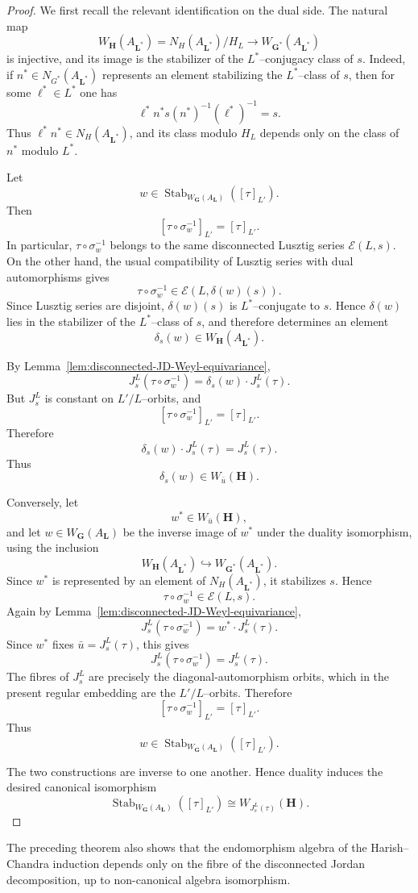 \documentclass{amsart}
\theoremstyle{plain}
\numberwithin{equation}{section}
\theoremstyle{definition}
\newcommand{\Stab}{\operatorname{Stab}}
\newcommand{\bG}{\mathbf{G}}
\newcommand{\bL}{\mathbf{L}}
\newcommand{\bH}{\mathbf{H}}
\begin{document}
\begin{proof}
We first recall the relevant identification on the dual side.  The natural
map
\[
W_{\bH}(A_{\bL^*})
=
N_H(A_{\bL^*})/H_L
\longrightarrow
W_{\bG^*}(A_{\bL^*})
\]
is injective, and its image is the stabilizer of the $L^*$--conjugacy class
of $s$.  Indeed, if $n^*\in N_{G^*}(A_{\bL^*})$ represents an element
stabilizing the $L^*$--class of $s$, then for some $\ell^*\in L^*$ one has
\[
\ell^* n^* s(n^*)^{-1}(\ell^*)^{-1}=s.
\]
Thus $\ell^*n^*\in N_H(A_{\bL^*})$, and its class modulo $H_L$ depends only
on the class of $n^*$ modulo $L^*$.

Let
\[
w\in \Stab_{W_{\bG}(A_{\bL})}([\tau]_{L'}).
\]
Then
\[
[\tau\circ\sigma_w^{-1}]_{L'}=[\tau]_{L'}.
\]
In particular, $\tau\circ\sigma_w^{-1}$ belongs to the same disconnected
Lusztig series $\mathcal E(L,s)$.  On the other hand, the usual compatibility
of Lusztig series with dual automorphisms gives
\[
\tau\circ\sigma_w^{-1}
\in
\mathcal E(L,\delta(w)(s)).
\]
Since Lusztig series are disjoint, $\delta(w)(s)$ is $L^*$--conjugate to
$s$.  Hence $\delta(w)$ lies in the stabilizer of the $L^*$--class of $s$,
and therefore determines an element
\[
\delta_s(w)\in W_{\bH}(A_{\bL^*}).
\]

By Lemma~\ref{lem:disconnected-JD-Weyl-equivariance},
\[
J_s^L(\tau\circ\sigma_w^{-1})
=
\delta_s(w)\cdot J_s^L(\tau).
\]
But $J_s^L$ is constant on $L'/L$--orbits, and
\[
[\tau\circ\sigma_w^{-1}]_{L'}=[\tau]_{L'}.
\]
Therefore
\[
\delta_s(w)\cdot J_s^L(\tau)=J_s^L(\tau).
\]
Thus
\[
\delta_s(w)\in W_{\bar u}(\bH).
\]

Conversely, let
\[
w^*\in W_{\bar u}(\bH),
\]
and let $w\in W_{\bG}(A_{\bL})$ be the inverse image of $w^*$ under the
duality isomorphism, using the inclusion
\[
W_{\bH}(A_{\bL^*})
\hookrightarrow
W_{\bG^*}(A_{\bL^*}).
\]
Since $w^*$ is represented by an element of $N_H(A_{\bL^*})$, it stabilizes
$s$.  Hence
\[
\tau\circ\sigma_w^{-1}\in\mathcal E(L,s).
\]
Again by Lemma~\ref{lem:disconnected-JD-Weyl-equivariance},
\[
J_s^L(\tau\circ\sigma_w^{-1})
=
w^*\cdot J_s^L(\tau).
\]
Since $w^*$ fixes $\bar u=J_s^L(\tau)$, this gives
\[
J_s^L(\tau\circ\sigma_w^{-1})=J_s^L(\tau).
\]
The fibres of $J_s^L$ are precisely the diagonal-automorphism orbits, which
in the present regular embedding are the $L'/L$--orbits.  Therefore
\[
[\tau\circ\sigma_w^{-1}]_{L'}=[\tau]_{L'}.
\]
Thus
\[
w\in \Stab_{W_{\bG}(A_{\bL})}([\tau]_{L'}).
\]

The two constructions are inverse to one another.  Hence duality induces the
desired canonical isomorphism
\[
\Stab_{W_{\bG}(A_{\bL})}([\tau]_{L'})
\cong
W_{J_s^L(\tau)}(\bH).
\]
\end{proof}
The preceding theorem also shows that the endomorphism algebra of the
Harish--Chandra induction depends only on the fibre of the disconnected Jordan
decomposition, up to non-canonical algebra isomorphism.
\end{document}
